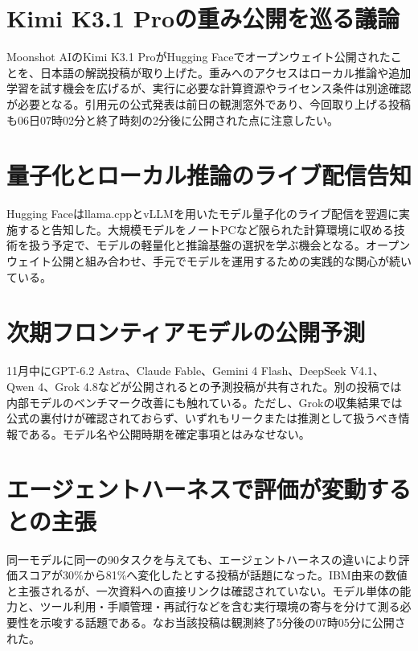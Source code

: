 \section{Kimi K3.1 Proの重み公開を巡る議論}
Moonshot AIのKimi K3.1 ProがHugging Faceでオープンウェイト公開されたことを、日本語の解説投稿が取り上げた。重みへのアクセスはローカル推論や追加学習を試す機会を広げるが、実行に必要な計算資源やライセンス条件は別途確認が必要となる。引用元の公式発表は前日の観測窓外であり、今回取り上げる投稿も06日07時02分と終了時刻の2分後に公開された点に注意したい。

\section{量子化とローカル推論のライブ配信告知}
Hugging Faceはllama.cppとvLLMを用いたモデル量子化のライブ配信を翌週に実施すると告知した。大規模モデルをノートPCなど限られた計算環境に収める技術を扱う予定で、モデルの軽量化と推論基盤の選択を学ぶ機会となる。オープンウェイト公開と組み合わせ、手元でモデルを運用するための実践的な関心が続いている。

\section{次期フロンティアモデルの公開予測}
11月中にGPT-6.2 Astra、Claude Fable、Gemini 4 Flash、DeepSeek V4.1、Qwen 4、Grok 4.8などが公開されるとの予測投稿が共有された。別の投稿では内部モデルのベンチマーク改善にも触れている。ただし、Grokの収集結果では公式の裏付けが確認されておらず、いずれもリークまたは推測として扱うべき情報である。モデル名や公開時期を確定事項とはみなせない。

\section{エージェントハーネスで評価が変動するとの主張}
同一モデルに同一の90タスクを与えても、エージェントハーネスの違いにより評価スコアが30\%から81\%へ変化したとする投稿が話題になった。IBM由来の数値と主張されるが、一次資料への直接リンクは確認されていない。モデル単体の能力と、ツール利用・手順管理・再試行などを含む実行環境の寄与を分けて測る必要性を示唆する話題である。なお当該投稿は観測終了5分後の07時05分に公開された。

